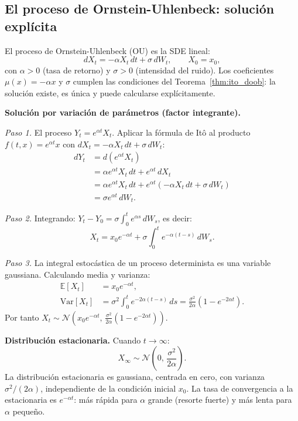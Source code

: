 \subsection{El proceso de Ornstein-Uhlenbeck: solución explícita}
\label{subsec:ou}

El proceso de Ornstein-Uhlenbeck (OU) es la SDE lineal:
\begin{equation}
  dX_t = -\alpha X_t\,dt + \sigma\,dW_t, \qquad X_0 = x_0,
  \label{eq:ou}
\end{equation}
con $\alpha > 0$ (tasa de retorno) y $\sigma > 0$ (intensidad del ruido).
Los coeficientes $\mu(x) = -\alpha x$ y $\sigma$ cumplen las condiciones del
Teorema~\ref{thm:ito_doob}: la solución existe, es única y puede calcularse
explícitamente.

\medskip
\noindent\textbf{Solución por variación de parámetros (factor integrante).}

\noindent\textit{Paso 1.} El proceso $Y_t = e^{\alpha t}X_t$. Aplicar la
fórmula de Itô al producto $f(t,x) = e^{\alpha t}x$ con $dX_t = -\alpha X_t\,dt
+ \sigma\,dW_t$:
\begin{align*}
  dY_t &= d(e^{\alpha t}X_t) \\
  &= \alpha e^{\alpha t}X_t\,dt + e^{\alpha t}\,dX_t \\
  &= \alpha e^{\alpha t}X_t\,dt + e^{\alpha t}(-\alpha X_t\,dt + \sigma\,dW_t) \\
  &= \sigma e^{\alpha t}\,dW_t.
\end{align*}

\noindent\textit{Paso 2.} Integrando:
$Y_t - Y_0 = \sigma\int_0^t e^{\alpha s}\,dW_s$, es decir:
\begin{equation}
  X_t = x_0 e^{-\alpha t}
  + \sigma\int_0^t e^{-\alpha(t-s)}\,dW_s.
  \label{eq:ou_sol}
\end{equation}

\noindent\textit{Paso 3.} La integral estocástica de un proceso determinista
es una variable gaussiana. Calculando media y varianza:
\begin{align*}
  \mathbb{E}[X_t] &= x_0 e^{-\alpha t}, \\
  \mathrm{Var}[X_t]
  &= \sigma^2\int_0^t e^{-2\alpha(t-s)}\,ds
   = \frac{\sigma^2}{2\alpha}(1-e^{-2\alpha t}).
\end{align*}
Por tanto $X_t \sim \mathcal{N}(x_0 e^{-\alpha t},\,\frac{\sigma^2}{2\alpha}
(1-e^{-2\alpha t}))$.

\medskip
\noindent\textbf{Distribución estacionaria.}
Cuando $t \to \infty$:
\begin{equation}
  X_\infty \sim \mathcal{N}\!\left(0,\, \frac{\sigma^2}{2\alpha}\right).
  \label{eq:ou_estacionaria}
\end{equation}
La distribución estacionaria es gaussiana, centrada en cero, con varianza
$\sigma^2/(2\alpha)$, independiente de la condición inicial $x_0$. La tasa de
convergencia a la estacionaria es $e^{-\alpha t}$: más rápida para $\alpha$
grande (resorte fuerte) y más lenta para $\alpha$ pequeño.

